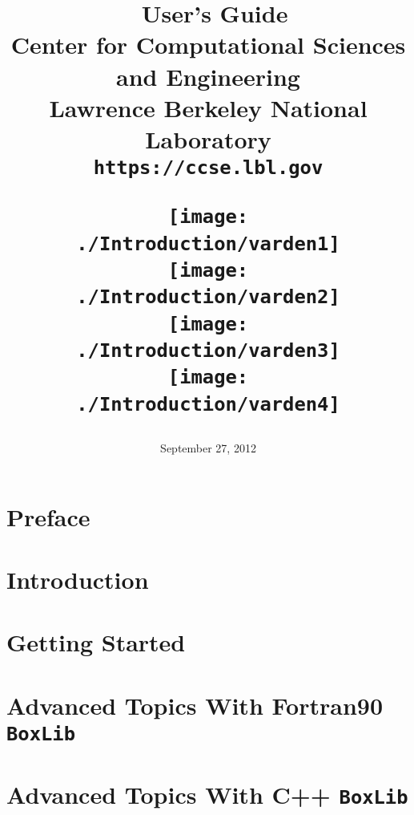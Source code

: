 \documentclass[11pt]{book}
\title{\Huge{\bf \BoxLib\ User's Guide}\\
       \vspace{0.5in}
       \Large{Center for Computational Sciences and Engineering}\\
       \Large{Lawrence Berkeley National Laboratory}\\
       \Large{\tt https://ccse.lbl.gov}
       \date{September 27, 2012}
\begin{figure}[b]
\centering
\texttt{[image: ./Introduction/varden1]}
\texttt{[image: ./Introduction/varden2]}\\
\texttt{[image: ./Introduction/varden3]}
\texttt{[image: ./Introduction/varden4]}
\end{figure}
}
\makeatletter
\newcommand{\BoxLib}{{\tt BoxLib}}
\renewcommand*\cleardoublepage{\clearpage\if@twoside
\ifodd\c@page\else
\hbox{}
\thispagestyle{empty}
\newpage
\if@twocolumn\hbox{}\newpage\fi\fi\fi}
\makeatother
\begin{document}
\frontmatter

\maketitle

\cleardoublepage

\setcounter{tocdepth}{1}
\tableofcontents

\cleardoublepage


\cleardoublepage

\chapter*{Preface}


\mainmatter

\chapter{Introduction}\label{Chap:Introduction}


\chapter{Getting Started}\label{Chap:Getting Started}


\chapter{Advanced Topics With Fortran90 \BoxLib}\label{Chap:Advanced Topics F}


\chapter{Advanced Topics With C++ \BoxLib}\label{Chap:Advanced Topics C}

\end{document}
